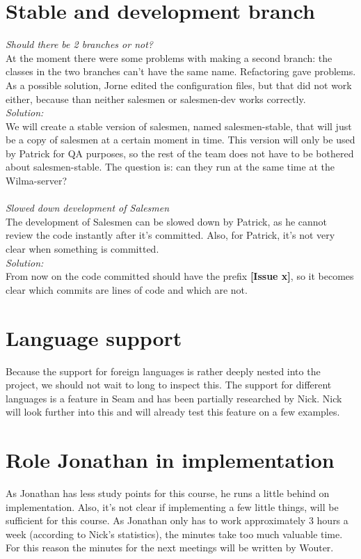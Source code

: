 \documentclass[a4paper, 12pt]{article}
\begin{document}
	\section{Stable and development branch}
		\textit{Should there be 2 branches or not?}\\
At the moment there were some problems with making a second branch: the classes in the two branches can't have the same name. Refactoring gave problems. As a possible solution, Jorne edited the configuration files, but that did not work either, because than neither salesmen or salesmen-dev works correctly.\\
		\textit{Solution:}\\
We will create a stable version of salesmen, named salesmen-stable, that will just be a copy of salesmen at a certain moment in time. This version will only be used by Patrick for QA purposes, so the rest of the team does not have to be bothered about salesmen-stable. The question is: can they run at the same time at the Wilma-server?\\ \\
		\textit{Slowed down development of Salesmen}\\
The development of Salesmen can be slowed down by Patrick, as he cannot review the code instantly after it's committed. Also, for Patrick, it's not very clear when something is committed. \\
		\textit{Solution:}\\
From now on the code committed should have the prefix \textbf{[Issue x]}, so it becomes clear which commits are lines of code and which are not.
	\section{Language support}
Because the support for foreign languages is rather deeply nested into the project, we should not wait to long to inspect this. The support for different languages is a feature in Seam and has been partially researched by Nick. Nick will look further into this and will already test this feature on a few examples.
	\section{Role Jonathan in implementation}
As Jonathan has less study points for this course, he runs a little behind on implementation. Also, it's not clear if implementing a few little things, will be sufficient for this course. As Jonathan only has to work approximately 3 hours a week (according to Nick's statistics), the minutes take too much valuable time. For this reason the minutes for the next meetings will be written by Wouter.
\end{document}
